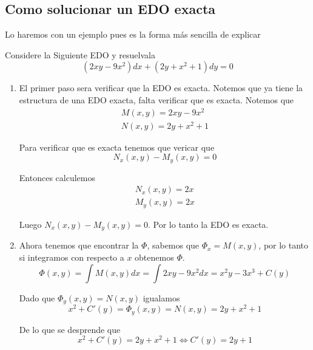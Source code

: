 \documentclass[a4paper,oneside,10.5pt]{article}
\begin{document}
\subsection*{Como solucionar un EDO exacta}
Lo haremos con un ejemplo pues es la forma m\'as sencilla de explicar
\begin{ejemplo}
  Considere la Siguiente EDO y resuelvala
  \begin{equation*}
    (2xy - 9x^{2}) dx + (2y + x^{2} + 1) dy = 0
  \end{equation*}

  \begin{enumerate}
    \item El primer paso sera verificar que la EDO es exacta. Notemos que ya tiene la estructura de una EDO exacta, falta verificar que es exacta. Notemos que
          \begin{gather*}
            M(x, y) = 2xy - 9x^{2}\\
            N(x, y) = 2y + x^{2} + 1
          \end{gather*}

          Para verificar que es exacta tenemos que vericar que
          \begin{equation*}
            N_{x}(x, y) - M_{y}(x, y) = 0
          \end{equation*}

          Entonces calculemos
          \begin{gather*}
            N_{x}(x, y) = 2x\\
            M_{y}(x, y) = 2x
          \end{gather*}

          Luego $N_{x}(x, y) - M_{y}(x, y) = 0$. Por lo tanto la EDO es exacta.
    \item Ahora tenemos que encontrar la $\Phi$, sabemos que $\Phi_{x} = M(x, y)$, por lo tanto si integramos con respecto a $x$ obtenemos $\Phi$.
          \begin{equation*}
            \Phi(x, y) = \int M(x, y) dx = \int 2xy - 9x^{2} dx = x^{2}y - 3x^{3} + C(y)
          \end{equation*}

          Dado que $\Phi_{y}(x, y) = N(x, y)$ igualamos
          \begin{equation*}
            x^{2} + C'(y) = \Phi_{y}(x, y) = N(x, y) = 2y + x^{2} + 1
          \end{equation*}

          De lo que se desprende que
          \begin{equation*}
            x^{2} + C'(y) = 2y + x^{2} + 1 \iff C'(y) = 2y + 1
          \end{equation*}


\end{enumerate}
\end{ejemplo}
\end{document}

